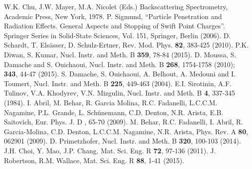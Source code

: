 \documentclass[aps,pra,reprint,groupedaddress]{revtex4-1}
\begin{document}
\begin{thebibliography}{00}
 W.K. Chu, J.W. Mayer, M.A. Nicolet (Eds.) Backscattering Spectrometry, Academic Press, New York, 1978.
 P. Sigmund, ``Particle Penetration and Radiation Effects. General Aspects and Stopping of Swift Point Charges''. Springer Series in Solid-State Sciences, Vol. 151, Springer, Berlin (2006).
 D. Schardt, T. Els\"asser, D. Schulz-Ertner, Rev. Mod. Phys. \textbf{82},  383-425 (2010).
 P.K. Diwan, S. Kumar, Nucl. Instr. and Meth. B \textbf{359}, 78-84 (2015).
 D. Moussa, S. Damache and S. Ouichaoui, Nucl. Instr. and Meth. B \textbf{268}, 1754-1758 (2010); \textbf{343},  44-47 (2015).
 S. Damache, S. Ouichaoui, A. Belhout, A. Medouni and I. Toumert, Nucl. Instr. and Meth. B \textbf{225}, 449-463 (2004).
 E.I. Sirotinin, A.F. Tulinov, V.A. Khodyrev, V.N. Mizgulin, Nucl. Instr. and Meth. B \textbf{4}, 337-345 (1984).
 I. Abril, M. Behar, R. Garcia Molina, R.C. Fadanelli, L.C.C.M. Nagamine, P.L. Grande, L. Sch\"unemann, C.D. Denton, N.R. Arista, E.B. Saitovich,
Eur. Phys. J. D , 65-70 (2009).
 M. Behar, R.C. Fadanelli, I. Abril, R. Garcia-Molina, C.D. Denton, L.C.C.M. Nagamine, N.R. Arista, Phys. Rev. A \textbf{80},  062901 (2009).
 D. Primetzhofer, Nucl. Instr. and Meth. B \textbf{320}, 100-103 (2014).
 J.H. Choi, Y. Mao, J.P. Chang, Mat. Sci. Eng. R \textbf{72}, 97-136 (2011).
 J. Robertson, R.M. Wallace, Mat. Sci. Eng. R \textbf{88}, 1-41 (2015).

\end{thebibliography}
\end{document}
